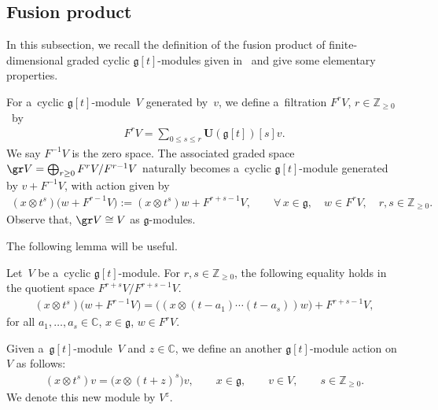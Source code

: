 \subsection{Fusion product}\label{section3.3}

In this subsection, we recall the def\/inition of the fusion product of f\/inite-dimensional graded cyclic
$\mathfrak{g}[t]$-modules given in~\cite{FL} and give some elementary properties.

For a~cyclic $\mathfrak{g}[t]$-module~$V$ generated by~$v$, we def\/ine a~f\/iltration $F^{r}V$, $r\in\mathbb{Z}_{\geq 0}$~by
\begin{gather*}
F^{r}V=\sum\limits_{0\leq s \leq r} \mathbf{U}(\mathfrak{g}[t])[s] v.
\end{gather*}
We say $F^{-1}V$ is the zero space.
The associated graded space $\gr V=\bigoplus_{r\geq 0} F^{r}V/ F^{r-1}V $ naturally becomes a~cyclic
$\mathfrak{g}[t]$-module generated by $v+F^{-1}V$, with action given by
\begin{gather*}
(x\otimes t^s)\big(w+F^{r-1}V\big):= (x\otimes t^s)w+F^{r+s-1}V,
\qquad
\forall\,
x\in \mathfrak{g},
\quad
w\in F^{r}V, \quad
r, s\in \mathbb{Z}_{\geq0}.
\end{gather*}
Observe that, $\gr V \cong V$ as $\mathfrak{g}$-modules.

The following lemma will be useful.
\begin{lemma}
\label{f1}
Let~$V$ be a~cyclic $\mathfrak{g}[t]$-module.
For $r,s\in \mathbb{Z}_{\geq0}$, the following equality holds in the quotient space $F^{r+s}V/ F^{r+s-1}V$.
\begin{gather*}
(x\otimes t^s)\big(w+F^{r-1}V\big)=\big((x\otimes (t-a_1)\cdots (t-a_s))w\big) + F^{r+s-1}V,
\end{gather*}
for all $a_1,\dots,a_s\in\mathbb{C}$,
$x\in \mathfrak{g}$, $w\in F^{r}V$.
\end{lemma}

Given a~$\mathfrak{g}[t]$-module~$V$ and $z\in\mathbb{C}$, we def\/ine an another $\mathfrak{g}[t]$-module action on~$V$
as follows:
\begin{gather*}
(x\otimes t^s)v=\big(x\otimes (t+z)^s\big)v,
\qquad
x\in\mathfrak{g},
\qquad
v\in V,
\qquad
s\in \mathbb{Z}_{\geq0}.
\end{gather*}
We denote this new module by $V^z$.

